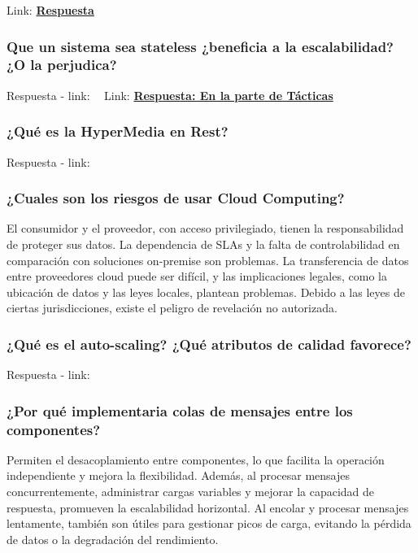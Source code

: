 \documentclass{article}
\begin{document}
    Link: \textbf{\hyperlink{page.24}{Respuesta}}

  \subsubsection{Que un sistema sea stateless ¿beneficia a la escalabilidad? ¿O la perjudica? }
    Respuesta - link: \textbf{~}
    Link: \textbf{\hyperlink{page.12}{Respuesta: En la parte de Tácticas}}

  \subsubsection{¿Qué es la HyperMedia en Rest?}
    Respuesta - link: \textbf{~}
    
  \subsubsection{¿Cuales son los riesgos de usar Cloud Computing?}
  El consumidor y el proveedor, con acceso privilegiado, tienen la responsabilidad de proteger sus datos. La dependencia de SLAs y la falta de controlabilidad en comparación con soluciones on-premise son problemas. La transferencia de datos entre proveedores cloud puede ser difícil, y las implicaciones legales, como la ubicación de datos y las leyes locales, plantean problemas. Debido a las leyes de ciertas jurisdicciones, existe el peligro de revelación no autorizada.

  \subsubsection{¿Qué es el auto-scaling? ¿Qué atributos de calidad favorece?}
    Respuesta - link: \textbf{~}

  \subsubsection{¿Por qué implementaria colas de mensajes entre los componentes?}
  
  Permiten el desacoplamiento entre componentes, lo que facilita la operación independiente y mejora la flexibilidad. Además, al procesar mensajes concurrentemente, administrar cargas variables y mejorar la capacidad de respuesta, promueven la escalabilidad horizontal. Al encolar y procesar mensajes lentamente, también son útiles para gestionar picos de carga, evitando la pérdida de datos o la degradación del rendimiento.
\end{document}

